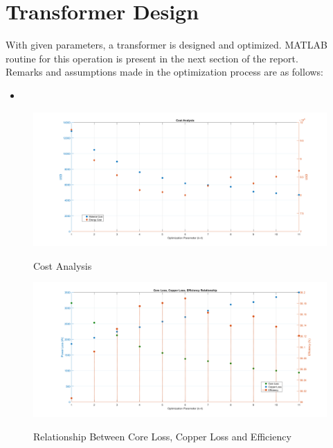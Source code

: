 \section{Transformer Design}

With given parameters, a transformer is designed and optimized. MATLAB routine for this operation is present in the next section of the report.\\

Remarks and assumptions made in the optimization process are as follows:
\\
\begin{itemize}

\item


\end{itemize}

\begin{figure}[H]
\hspace{1.5cm}
\centering\includegraphics[width=5.5in]{cost.PNG}\\
\caption{Cost Analysis}
\label{cost}
\end{figure} 

\begin{figure}[H]
\hspace{1.5cm}
\centering\includegraphics[width=5.5in]{core_copper_eff.PNG}\\
\caption{Relationship Between Core Loss, Copper Loss and Efficiency}
\label{cce}
\end{figure} 

